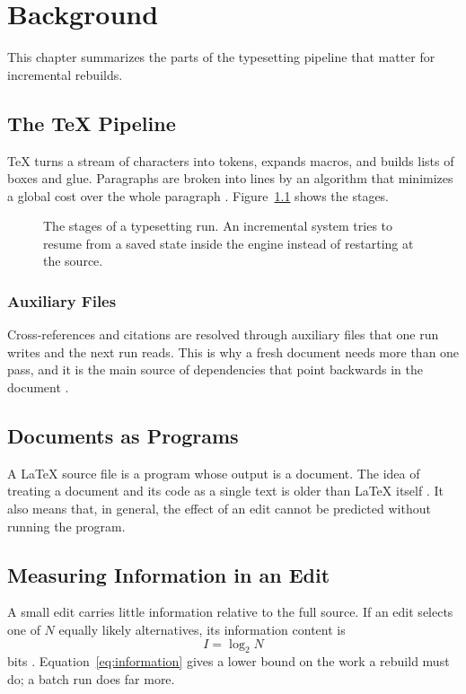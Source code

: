 \chapter{Background}
\label{chap:background}

This chapter summarizes the parts of the typesetting pipeline that matter for
incremental rebuilds.

\section{The \TeX{} Pipeline}
\label{sec:pipeline}

\TeX{} turns a stream of characters into tokens, expands macros, and builds
lists of boxes and glue. Paragraphs are broken into lines by an algorithm
that minimizes a global cost over the whole paragraph
\citep{knuth1981breaking}. Figure~\ref{fig:pipeline} shows the stages.

\begin{figure}[ht]
  \centering
  
  \caption{The stages of a typesetting run. An incremental system tries to
           resume from a saved state inside the engine instead of restarting
           at the source.}
  \label{fig:pipeline}
\end{figure}

\subsection{Auxiliary Files}
\label{sec:aux}

Cross-references and citations are resolved through auxiliary files that one
run writes and the next run reads. This is why a fresh document needs more
than one pass, and it is the main source of dependencies that point backwards
in the document \citep{mittelbach2004companion}.

\section{Documents as Programs}
\label{sec:programs}

A \LaTeX{} source file is a program whose output is a document. The idea of
treating a document and its code as a single text is older than \LaTeX{}
itself \citep{knuth1984literate}. It also means that, in general, the effect
of an edit cannot be predicted without running the program.

\section{Measuring Information in an Edit}
\label{sec:information}

A small edit carries little information relative to the full source. If an
edit selects one of $N$ equally likely alternatives, its information content
is
\begin{equation}
  I = \log_2 N
  \label{eq:information}
\end{equation}
bits \citep{shannon1948mathematical}. Equation~\ref{eq:information} gives a
lower bound on the work a rebuild must do; a batch run does far more.
